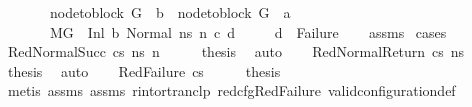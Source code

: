 \begin{isabellebody}
\ \ \ \ \ \ \ {\isachardoublequoteopen}node{\isacharunderscore}{\kern0pt}to{\isacharunderscore}{\kern0pt}block\ G\ {\isacharbang}{\kern0pt}\ b\ {\isacharequal}{\kern0pt}\ node{\isacharunderscore}{\kern0pt}to{\isacharunderscore}{\kern0pt}block\ G{\isacharprime}{\kern0pt}\ {\isacharbang}{\kern0pt}\ a{\isachardoublequoteclose}\isanewline
\ \ \ \ \ \ \ {\isachardoublequoteopen}M{\isacharcomma}{\kern0pt}{\isasymLambda}{\isacharcomma}{\kern0pt}{\isasymGamma}{\isacharcomma}{\kern0pt}{\isasymOmega}{\isacharcomma}{\kern0pt}G\ {\isasymturnstile}\ {\isacharparenleft}{\kern0pt}Inl\ b{\isacharcomma}{\kern0pt}\ Normal\ ns{\isacharparenright}{\kern0pt}\ {\isacharminus}{\kern0pt}n{\isasymrightarrow}\ {\isacharparenleft}{\kern0pt}c{\isacharcomma}{\kern0pt}\ d{\isacharparenright}{\kern0pt}{\isachardoublequoteclose}\isanewline
\ \ \ \ \ {\isachardoublequoteopen}d\ {\isasymnoteq}\ Failure{\isachardoublequoteclose}\isanewline
%
\isadelimproof
\ \ %
\endisadelimproof
%
\isatagproof
{}\isamarkupfalse%
\ assms{\isacharparenleft}{\kern0pt}{}{\isacharparenright}{\kern0pt}\isanewline
{}\isamarkupfalse%
\ cases\isanewline
\ \ \isamarkupfalse%
\ {\isacharparenleft}{\kern0pt}RedNormalSucc\ cs\ ns{\isacharprime}{\kern0pt}\ n{\isacharprime}{\kern0pt}{\isacharparenright}{\kern0pt}\isanewline
\ \ \isamarkupfalse%
\ \isamarkupfalse%
\ {\isacharquery}{\kern0pt}thesis\ \isamarkupfalse%
\ auto\isanewline
{}\isamarkupfalse%
\isanewline
\ \ \isamarkupfalse%
\ {\isacharparenleft}{\kern0pt}RedNormalReturn\ cs\ ns{\isacharprime}{\kern0pt}{\isacharparenright}{\kern0pt}\isanewline
\ \ \isamarkupfalse%
\ \isamarkupfalse%
\ {\isacharquery}{\kern0pt}thesis\ \isamarkupfalse%
\ auto\isanewline
{}\isamarkupfalse%
\isanewline
\ \ \isamarkupfalse%
\ {\isacharparenleft}{\kern0pt}RedFailure\ cs{\isacharparenright}{\kern0pt}\isanewline
\ \ \isamarkupfalse%
\ \isamarkupfalse%
\ {\isacharquery}{\kern0pt}thesis\isanewline
\ \ \ \ \isamarkupfalse%
\ {\isacharparenleft}{\kern0pt}metis\ assms{\isacharparenleft}{\kern0pt}{}{\isacharparenright}{\kern0pt}\ assms{\isacharparenleft}{\kern0pt}{}{\isacharparenright}{\kern0pt}\ r{\isacharunderscore}{\kern0pt}into{\isacharunderscore}{\kern0pt}rtranclp\ red{\isacharunderscore}{\kern0pt}cfg{\isachardot}{\kern0pt}RedFailure\ valid{\isacharunderscore}{\kern0pt}configuration{\isacharunderscore}{\kern0pt}def{\isacharparenright}{\kern0pt}\isanewline

\end{isabellebody}
